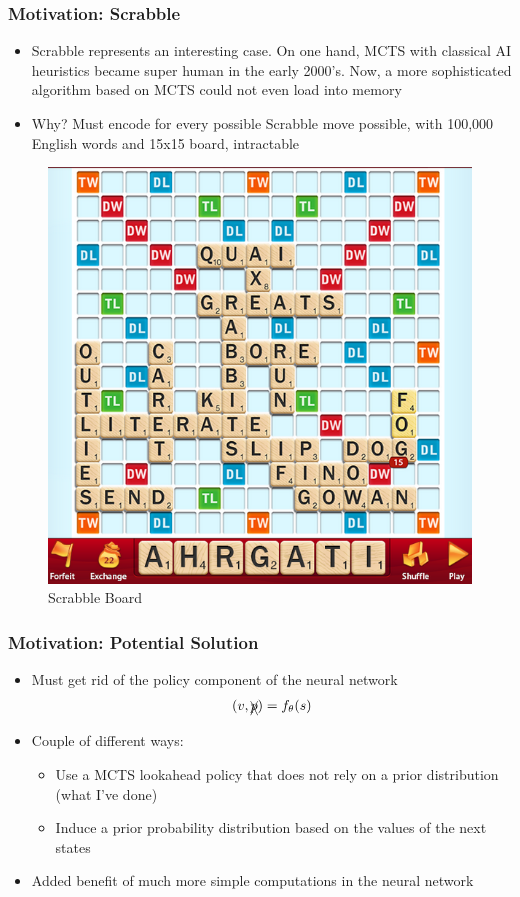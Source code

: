 \documentclass{beamer}
\begin{document}
\begin{frame}
  \frametitle{Motivation: Scrabble}

  \begin{itemize}
    \item Scrabble represents an interesting case. On one hand, MCTS with classical AI heuristics became super human in the early 2000's. Now, a more sophisticated algorithm based on MCTS could not even load into memory
    \item Why? Must encode for every possible Scrabble move possible, with 100,000 English words and 15x15 board, intractable
  \end{itemize}

  \begin{figure}
    \includegraphics[width=0.29\linewidth]{./images/scrabble.png}
    \caption{Scrabble Board}
  \end{figure}
\end{frame}



\begin{frame}
  \frametitle{Motivation: Potential Solution}

  \begin{itemize}
    \item Must get rid of the policy component of the neural network
      \begin{gather*}
        (v, \xcancel{p}) = f_\theta{(s)}
      \end{gather*}
    \item Couple of different ways:
      \begin{itemize}
        \item Use a MCTS lookahead policy that does not rely on a prior distribution (what I've done)
        \item Induce a prior probability distribution based on the values of the next states
      \end{itemize}
    \item Added benefit of much more simple computations in the neural network
  \end{itemize}
\end{frame}
\end{document}
